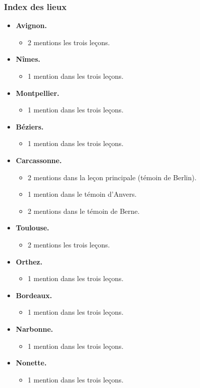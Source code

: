 \documentclass[12pt, a4paper]{article}
\begin{document}
	\subsubsection{Index des lieux}
	\begin{itemize} \item{\textbf{Avignon.}  \begin{itemize} \item{2 mentions les trois leçons.}  \end{itemize}}  \item{\textbf{Nîmes.}  \begin{itemize} \item{1 mention dans les trois leçons.}  \end{itemize}}  \item{\textbf{Montpellier.}  \begin{itemize} \item{1 mention dans les trois leçons.}  \end{itemize}}  \item{\textbf{Béziers.}  \begin{itemize} \item{1 mention dans les trois leçons.}  \end{itemize}}  \item{\textbf{Carcassonne.}  \begin{itemize} \item{2 mentions dans la leçon principale (témoin de Berlin).}  \item{1 mention dans le témoin d'Anvers.}  \item{2 mentions dans le témoin de Berne.}  \end{itemize}}  \item{\textbf{Toulouse.}  \begin{itemize} \item{2 mentions les trois leçons.}  \end{itemize}}  \item{\textbf{Orthez.}  \begin{itemize} \item{1 mention dans les trois leçons.}  \end{itemize}}  \item{\textbf{Bordeaux.}  \begin{itemize} \item{1 mention dans les trois leçons.}  \end{itemize}}  \item{\textbf{Narbonne.}  \begin{itemize} \item{1 mention dans les trois leçons.}  \end{itemize}}  \item{\textbf{Nonette.}  \begin{itemize} \item{1 mention dans les trois leçons.}  \end{itemize}} \end{itemize}
	\pagebreak
	
\end{document}
